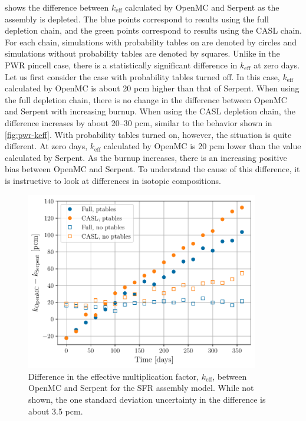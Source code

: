 \documentclass[3p,authoryear]{elsarticle}
\begin{document}

 shows the difference between $k_\text{eff}$ calculated by
OpenMC and Serpent as the assembly is depleted. The blue points correspond to
results using the full depletion chain, and the green points correspond to
results using the CASL chain. For each chain, simulations with probability
tables on are denoted by circles and simulations without probability tables are
denoted by squares. Unlike in the PWR pincell case, there is a statistically
significant difference in $k_\text{eff}$ at zero days. Let us first consider the
case with probability tables turned off. In this case, $k_\text{eff}$ calculated
by OpenMC is about 20 pcm higher than that of Serpent. When using the full
depletion chain, there is no change in the difference between OpenMC and Serpent
with increasing burnup. When using the CASL depletion chain, the difference
increases by about 20--30 pcm, similar to the behavior shown in
\cref{fig:pwr-keff}. With probability tables turned on, however, the situation
is quite different. At zero days, $k_\text{eff}$ calculated by OpenMC is 20 pcm
lower than the value calculated by Serpent. As the burnup increases, there is an
increasing positive bias between OpenMC and Serpent. To understand the cause of
this difference, it is instructive to look at differences in isotopic
compositions.
\begin{figure}[H]
  \centering
  \includegraphics[width=4in]{figures/sfr_keff.pdf}
  \caption{Difference in the effective multiplication factor, $k_\text{eff}$,
  between OpenMC and Serpent for the SFR assembly model. While not shown, the one
  standard deviation uncertainty in the difference is about 3.5 pcm.}
  \label{fig:sfr-keff}
\end{figure}
\end{document}

